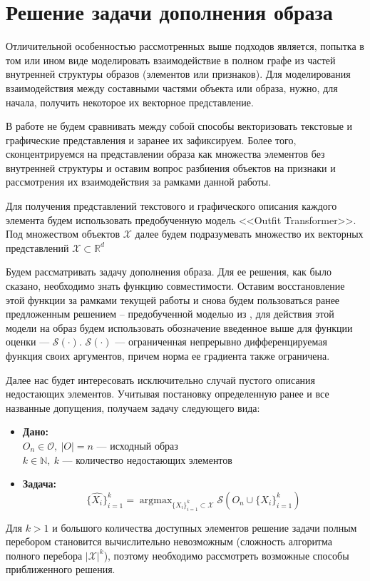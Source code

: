 \documentclass[a4paper,14pt]{extarticle}
\DeclareMathOperator*{\argmax}{argmax}
\begin{document}
		\section{Решение задачи дополнения образа}
				Отличительной особенностью рассмотренных выше подходов является, попытка в том или ином виде моделировать взаимодействие в полном графе из частей внутренней структуры образов (элементов или признаков). Для моделирования взаимодействия между составными частями объекта или образа, нужно, для начала, получить некоторое их векторное представление. 
				
				В работе не будем сравнивать между собой способы векторизовать текстовые и графические представления и заранее их зафиксируем. Более того, сконцентрируемся на представлении образа как множества элементов без внутренней структуры и оставим вопрос разбиения объектов на признаки и рассмотрения их взаимодействия за рамками данной работы.
								
				Для получения представлений текстового и графического описания каждого элемента будем использовать предобученную модель <<Outfit Transformer>>\cite{https://doi.org/10.48550/arXiv.2204.04812}. Под множеством объектов $\mathcal{X}$ далее будем подразумевать множество их векторных представлений $\mathcal{X}\subset \mathbb{R}^d$
				
				Будем рассматривать задачу дополнения образа. Для ее решения, как было сказано, необходимо знать функцию совместимости. Оставим восстановление этой функции за рамками текущей работы и снова будем пользоваться ранее предложенным решением -- предобученной моделью из \cite{https://doi.org/10.48550/arXiv.2204.04812}, для действия этой модели на образ будем использовать обозначение введенное выше для функции оценки --- $\mathcal{S}(\cdot)$. 
				$\mathcal{S}(\cdot)$ --- ограниченная непрерывно дифференцируемая функция своих аргументов, причем норма ее градиента также ограничена. 
				
				Далее нас будет интересовать исключительно случай пустого описания недостающих элементов. Учитывая постановку определенную ранее и все названные допущения, получаем задачу следующего вида:
				\begin{itemize}
					\item[] \textbf{Дано:}\\
					$O_n\in\mathcal{O}, ~|O| = n$ --- исходный образ \\
					$k \in \mathbb{N}, ~k$ --- количество недостающих элементов\\					
					\item[] \textbf{Задача:}
					$$\{\hat{X_i}\}_{i=1}^k= \argmax_{\{X_i\}_{i=1}^k\subset\mathcal{X}} \mathcal{S}\left(O_n\cup\{X_i\}_{i=1}^k\right)$$
				\end{itemize}
				Для $k > 1$ и большого количества доступных элементов решение задачи полным перебором  становится вычислительно невозможным (сложность алгоритма полного перебора $|\mathcal{X}|^k$), поэтому необходимо рассмотреть возможные способы приближенного решения. 
				
\end{document}
